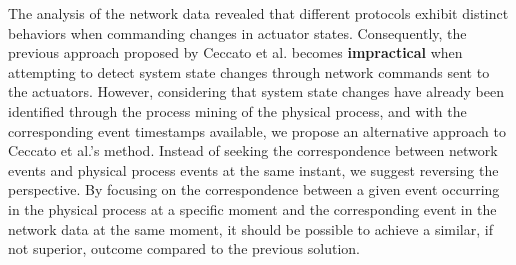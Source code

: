 
\bigskip
The analysis of the network data revealed that different protocols exhibit distinct behaviors when commanding changes in actuator states. Consequently, the previous approach proposed by Ceccato et al. becomes \textbf{impractical} when attempting to detect system state changes through network commands sent to the actuators.\newline
However, considering that system state changes have already been identified through the process mining of the physical process, and with the corresponding event timestamps available, we propose an alternative approach to Ceccato et al.'s method. Instead of seeking the correspondence between network events and physical process events at the same instant, we suggest reversing the perspective. By focusing on the correspondence between a given event occurring in the physical process at a specific moment and the corresponding event in the network data at the same moment, it should be possible to achieve a similar, if not superior, outcome compared to the previous solution.\newline


\vfill
\nolinenumbers